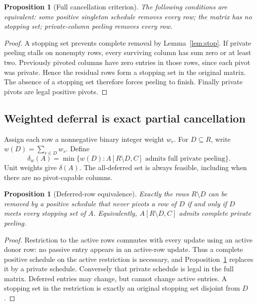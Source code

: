 \documentclass[11pt]{article}
\newtheorem{proposition}[theorem]{Proposition}
\theoremstyle{definition}\newtheorem{definition}[theorem]{Definition}
\theoremstyle{remark}\newtheorem{remark}[theorem]{Remark}
\begin{document}
\begin{proposition}[Full cancellation criterion]
\label{prop:full}
The following conditions are equivalent: some positive singleton schedule removes every row; the matrix has no stopping set; private-column peeling removes every row.
\end{proposition}
\begin{proof}
A stopping set prevents complete removal by Lemma~\ref{lem:stop}. If private peeling stalls on nonempty rows, every surviving column has sum zero or at least two. Previously pivoted columns have zero entries in those rows, since each pivot was private. Hence the residual rows form a stopping set in the original matrix. The absence of a stopping set therefore forces peeling to finish. Finally private pivots are legal positive pivots.
\end{proof}

\subsection{Weighted deferral is exact partial cancellation}
Assign each row a nonnegative binary integer weight $w_r$. For $D\subseteq R$, write $w(D)=\sum_{r\in D}w_r$. Define
\begin{equation}
 \delta_w(A)=\min\{w(D): A[R\setminus D,C]\text{ admits full private peeling}\}.
 \label{eq:objective}
\end{equation}
Unit weights give $\delta(A)$. The all-deferred set is always feasible, including when there are no pivot-capable columns.

\begin{proposition}[Deferred-row equivalence]
\label{prop:defer}
Exactly the rows $R\setminus D$ can be removed by a positive schedule that never pivots a row of $D$ if and only if $D$ meets every stopping set of $A$. Equivalently, $A[R\setminus D,C]$ admits complete private peeling.
\end{proposition}
\begin{proof}
Restriction to the active rows commutes with every update using an active donor row: no passive entry appears in an active-row update. Thus a complete positive schedule on the active restriction is necessary, and Proposition~\ref{prop:full} replaces it by a private schedule. Conversely that private schedule is legal in the full matrix. Deferred entries may change, but cannot change active entries. A stopping set in the restriction is exactly an original stopping set disjoint from $D$.
\end{proof}
\end{document}
